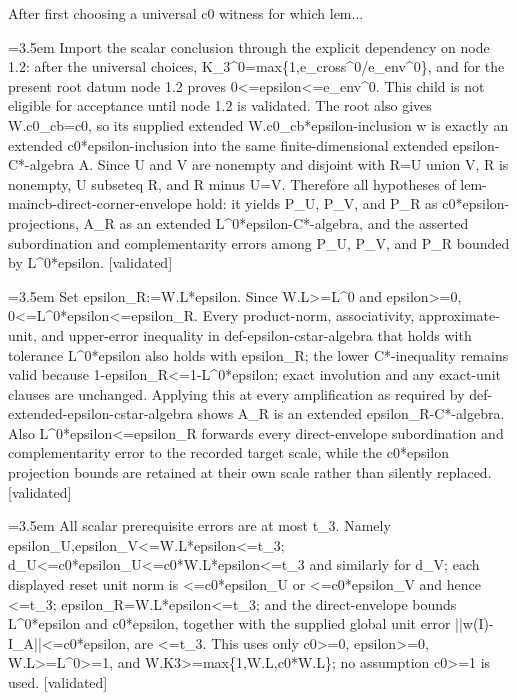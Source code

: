 \documentclass{article}
\newcommand{\step}[1]{\par\noindent\hangindent=3.5em\hangafter=1%
  \makebox[3.5em][l]{\textbf{#1.}}}
\newcommand{\steptag}[1]{\hfill{\small\textsf{[#1]}}}
\begin{document}
\begin{proofbox}{After first choosing a universal c0 witness for which lem...}
\step{1.3.1.1} Import the scalar conclusion through the explicit dependency on node 1.2: after the universal choices, K\_3\textasciicircum{}0=max\{1,e\_cross\textasciicircum{}0/e\_env\textasciicircum{}0\}, and for the present root datum node 1.2 proves 0<=epsilon<=e\_env\textasciicircum{}0. This child is not eligible for acceptance until node 1.2 is validated. The root also gives W.c0\_cb=c0, so its supplied extended W.c0\_cb*epsilon-inclusion w is exactly an extended c0*epsilon-inclusion into the same finite-dimensional extended epsilon-C*-algebra A. Since U and V are nonempty and disjoint with R=U union V, R is nonempty, U subseteq R, and R minus U=V. Therefore all hypotheses of lem-maincb-direct-corner-envelope hold: it yields P\_U, P\_V, and P\_R as c0*epsilon-projections, A\_R as an extended L\textasciicircum{}0*epsilon-C*-algebra, and the asserted subordination and complementarity errors among P\_U, P\_V, and P\_R bounded by L\textasciicircum{}0*epsilon. \steptag{validated} \\[4pt]
\step{1.3.2} Set epsilon\_R:=W.L*epsilon. Since W.L>=L\textasciicircum{}0 and epsilon>=0, 0<=L\textasciicircum{}0*epsilon<=epsilon\_R. Every product-norm, associativity, approximate-unit, and upper-error inequality in def-epsilon-cstar-algebra that holds with tolerance L\textasciicircum{}0*epsilon also holds with epsilon\_R; the lower C*-inequality remains valid because 1-epsilon\_R<=1-L\textasciicircum{}0*epsilon; exact involution and any exact-unit clauses are unchanged. Applying this at every amplification as required by def-extended-epsilon-cstar-algebra shows A\_R is an extended epsilon\_R-C*-algebra. Also L\textasciicircum{}0*epsilon<=epsilon\_R forwards every direct-envelope subordination and complementarity error to the recorded target scale, while the c0*epsilon projection bounds are retained at their own scale rather than silently replaced. \steptag{validated} \\[4pt]
\step{1.4} All scalar prerequisite errors are at most t\_3. Namely epsilon\_U,epsilon\_V<=W.L*epsilon<=t\_3; d\_U<=c0*epsilon\_U<=c0*W.L*epsilon<=t\_3 and similarly for d\_V; each displayed reset unit norm is <=c0*epsilon\_U or <=c0*epsilon\_V and hence <=t\_3; epsilon\_R=W.L*epsilon<=t\_3; and the direct-envelope bounds L\textasciicircum{}0*epsilon and c0*epsilon, together with the supplied global unit error ||w(I)-I\_A||<=c0*epsilon, are <=t\_3. This uses only c0>=0, epsilon>=0, W.L>=L\textasciicircum{}0>=1, and W.K3>=max\{1,W.L,c0*W.L\}; no assumption c0>=1 is used. \steptag{validated} \\[6pt]

\end{proofbox}
\end{document}
